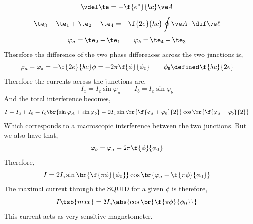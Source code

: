 \documentclass{article}
\newcommand{\vp}{\varphi}
\begin{document}
\[ \vdel \te = - \f{e^*}{\hbar c} \ve A \]
\[ \te_3 - \te_1 + \te_2 - \te_4 = -\f{2e}{\hbar c} \oint \ve A \cdot \dif \ve \ell \]
\[ \varphi_a = \te_2 - \te_1 \qquad \varphi_b = \te_4 - \te_3 \]
Therefore the difference of the two phase differences across the two junctions is,
\[ \varphi_a - \varphi_b = -\f{2e}{\hbar c}\phi = - 2\pi \f{\phi}{\phi_0} \qquad \phi_0 \defined \f{hc}{2e}\]
Therefore the currents across the junctions are,
\[ I_a = I_c \sin \varphi_a \qquad I_b = I_c \sin \varphi_b \]
And the total interference becomes,
\[ I = I_a + I_b = I_c \br{\sin \vp_A + \sin \vp_b} = 2 I_c \sin\br{\f{\vp_a + \vp_b}{2}}\cos\br{\f{\vp_a - \vp_b}{2}} \]
Which corresponds to a macroscopic interference between the two junctions. But we also have that,
\[ \vp_b = \vp_a + 2 \pi \f{\phi}{\phi_0} \]
Therefore,
\[ I = 2 I_c \sin\br{\f{\pi\phi}{\phi_0}}\cos\br{\vp_a + \f{\pi \phi}{\phi_0}} \]
The maximal current through the SQUID for a given $\phi$ is therefore,
\[ I\tsb{max} = 2 I_c \abs{\cos \br{\f{\pi \phi}{\phi_0}}} \]
This current acts as very sensitive magnetometer.\\
\end{document}
